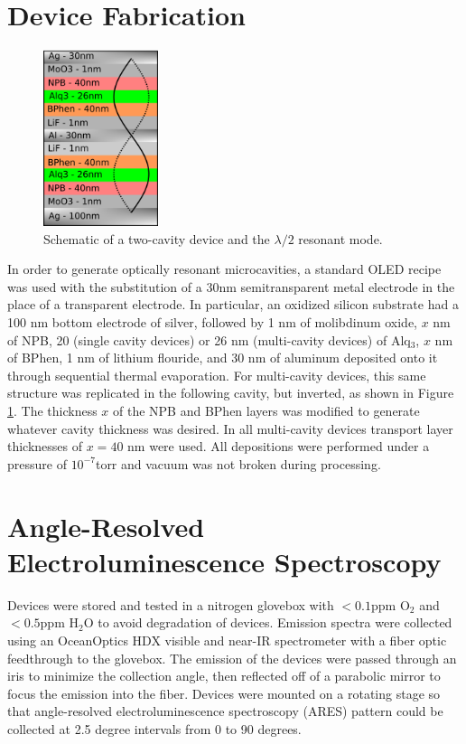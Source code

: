 \documentclass{report}
\begin{document}
    \section{Device Fabrication} \label{fab}
    \begin{figure}
        \centering
        \vspace{-0.5cm}
        \includegraphics[width=0.3\textwidth]{images/schematic.png}
        \caption{\small Schematic of a two-cavity device and the $\lambda/2$ resonant mode.}
        \label{fig:schematic}
        \vspace{-0.5cm}
    \end{figure}
    In order to generate optically resonant microcavities, a standard OLED recipe\cite{Cai2011,Matsushima2008} was used with the substitution of a 30nm semitransparent metal electrode in the place of a transparent electrode. In particular, an oxidized silicon substrate had a 100 nm bottom electrode of silver, followed by 1 nm of molibdinum oxide, $x$ nm of NPB, 20 (single cavity devices) or 26 nm (multi-cavity devices) of Alq$_3$, $x$ nm of BPhen, 1 nm of lithium flouride, and 30 nm of aluminum deposited onto it through sequential thermal evaporation. For multi-cavity devices, this same structure was replicated in the following cavity, but inverted, as shown in Figure \ref{fig:schematic}. The thickness $x$ of the NPB and BPhen layers was modified to generate whatever cavity thickness was desired. In all multi-cavity devices transport layer thicknesses of $x=40$ nm were used. All depositions were performed under a pressure of $10^{-7}$torr and vacuum was not broken during processing.

    \section{Angle-Resolved Electroluminescence Spectroscopy} \label{spect}
    Devices were stored and tested in a nitrogen glovebox with $<0.1$ppm O$_2$ and $<0.5$ppm H$_2$O to avoid degradation of devices. Emission spectra were collected using an OceanOptics HDX visible and near-IR spectrometer with a fiber optic feedthrough to the glovebox. The emission of the devices were passed through an iris to minimize the collection angle, then reflected off of a parabolic mirror to focus the emission into the fiber. Devices were mounted on a rotating stage so that angle-resolved electroluminescence spectroscopy (ARES) pattern could be collected at 2.5 degree intervals from 0 to 90 degrees.
\end{document}

